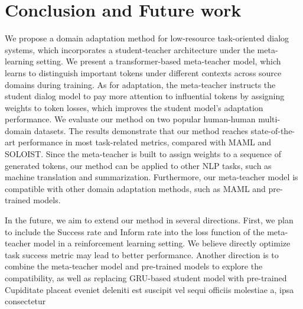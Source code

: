 \documentclass[letterpaper]{article} %
\begin{document}
\vspace{-1.64mm}
\section*{Conclusion and Future work}



We propose a domain adaptation method for low-resource task-oriented dialog systems, which incorporates a student-teacher architecture under the meta-learning setting.
We present a transformer-based meta-teacher model, which learns to distinguish important tokens under different contexts across source domains during training. As for adaptation, the meta-teacher instructs the student dialog model to pay more attention to influential tokens by assigning weights to token losses, which improves the student model's adaptation performance.
We evaluate our method on two popular human-human multi-domain datasets.
The results demonstrate that our method reaches state-of-the-art performance in most task-related metrics, compared with MAML and SOLOIST.
Since the meta-teacher is built to assign weights to a sequence of generated tokens, our method can be applied to other NLP tasks, such as machine translation and summarization.
Furthermore, our meta-teacher model is compatible with other domain adaptation methods, such as MAML and pre-trained models.


In the future, we aim to extend our method in several directions. First, we plan to include the Success rate and Inform rate into the loss function of the meta-teacher model in a reinforcement learning setting. We believe directly optimize task success metric may lead to better performance. Another direction is to combine the meta-teacher model and pre-trained models to explore the compatibility, as well as replacing GRU-based student model with pre-trained  Cupiditate placeat eveniet deleniti est suscipit vel sequi officiis molestiae a, ipsa consectetur

\end{document}
